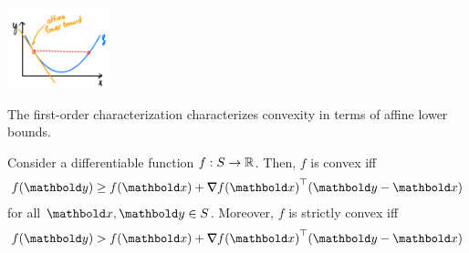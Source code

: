 \begin{marginfigure}
\centering\includegraphics[width=3cm]{notes/figures/1st_order_characterization.png}
\caption{The first-order characterization characterizes convexity in terms of affine lower bounds.}
\end{marginfigure}
\begin{thm} Consider a differentiable function $f: S \to \mathbb{R}$. Then, $f$ is convex iff \begin{align}
    f(\vy) \geq f(\vx) + \trans{\grad f(\vx)}(\vy - \vx)
\end{align} for all $\vx, \vy \in \sS$. Moreover, $f$ is strictly convex iff \begin{align}
    f(\vy) > f(\vx) + \trans{\grad f(\vx)}(\vy - \vx)
\end{align}
\end{thm}
